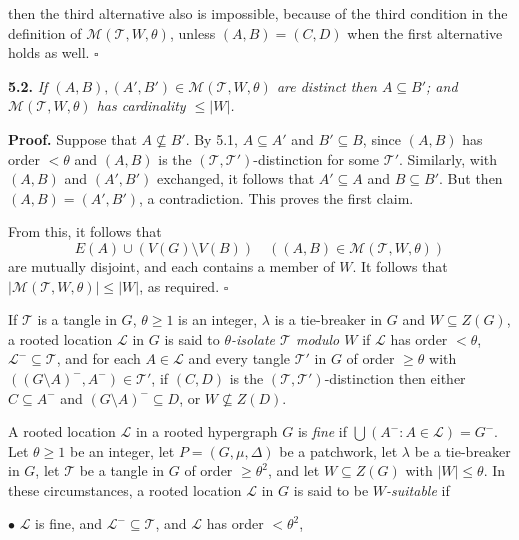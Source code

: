 \noindent then the third alternative also is impossible, because of the third condition in the definition of $\mathcal{M}(\mathcal{T}, W, \theta)$, unless $(A, B) = (C, D)$ when the first alternative holds as well. $\square$

\textbf{5.2.} \textit{If $(A, B), (A', B') \in \mathcal{M}(\mathcal{T}, W, \theta)$ are distinct then $A \subseteq B'$; and $\mathcal{M}(\mathcal{T}, W, \theta)$ has cardinality $\le |W|$.}

\textbf{Proof.} Suppose that $A \nsubseteq B'$. By 5.1, $A \subseteq A'$ and $B' \subseteq B$, since $(A, B)$ has order $< \theta$ and $(A, B)$ is the $(\mathcal{T}, \mathcal{T}')$-distinction for some $\mathcal{T}'$. Similarly, with $(A, B)$ and $(A', B')$ exchanged, it follows that $A' \subseteq A$ and $B \subseteq B'$. But then $(A, B) = (A', B')$, a contradiction. This proves the first claim.

From this, it follows that
\begin{equation*}
E(A) \cup (V(G) \setminus V(B)) \quad ((A, B) \in \mathcal{M}(\mathcal{T}, W, \theta))
\end{equation*}
are mutually disjoint, and each contains a member of $W$. It follows that $|\mathcal{M}(\mathcal{T}, W, \theta)| \le |W|$, as required. $\square$

If $\mathcal{T}$ is a tangle in $G$, $\theta \ge 1$ is an integer, $\lambda$ is a tie-breaker in $G$ and $W \subseteq Z(G)$, a rooted location $\mathcal{L}$ in $G$ is said to \textit{$\theta$-isolate $\mathcal{T}$ modulo $W$} if $\mathcal{L}$ has order $< \theta$, $\mathcal{L}^- \subseteq \mathcal{T}$, and for each $A \in \mathcal{L}$ and every tangle $\mathcal{T}'$ in $G$ of order $\ge \theta$ with $((G \setminus A)^-, A^-) \in \mathcal{T}'$, if $(C, D)$ is the $(\mathcal{T}, \mathcal{T}')$-distinction then either $C \subseteq A^-$ and $(G \setminus A)^- \subseteq D$, or $W \nsubseteq Z(D)$.

A rooted location $\mathcal{L}$ in a rooted hypergraph $G$ is \textit{fine} if $\bigcup(A^- : A \in \mathcal{L}) = G^-$. Let $\theta \ge 1$ be an integer, let $P = (G, \mu, \Delta)$ be a patchwork, let $\lambda$ be a tie-breaker in $G$, let $\mathcal{T}$ be a tangle in $G$ of order $\ge \theta^2$, and let $W \subseteq Z(G)$ with $|W| \le \theta$. In these circumstances, a rooted location $\mathcal{L}$ in $G$ is said to be \textit{$W$-suitable} if

\hspace*{12pt}$\bullet$ $\mathcal{L}$ is fine, and $\mathcal{L}^- \subseteq \mathcal{T}$, and $\mathcal{L}$ has order $< \theta^2$,

